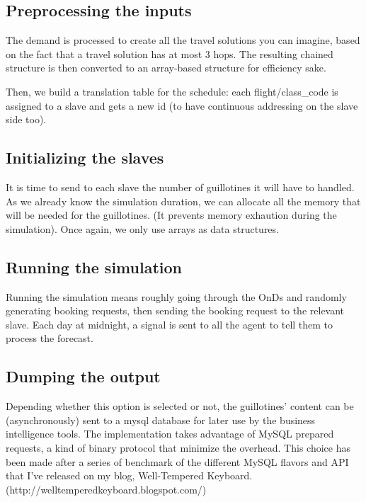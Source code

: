 \documentclass[11pt]{JHEP3}
\begin{document}
\subsection{Preprocessing the inputs}

The demand is processed to create all the travel solutions you can
imagine, based on the fact that a travel solution has at most 3
hops. The resulting chained structure is then converted to an
array-based structure for efficiency sake.

Then, we build a translation table for the schedule: each
flight/class\_code is assigned to a slave and gets a new id (to have
continuous addressing on the slave side too).

\subsection{Initializing the slaves}

It is time to send to each slave the number of guillotines it will have
to handled. As we already know the simulation duration, we can
allocate all the memory that will be needed for the guillotines. (It
prevents memory exhaution during the simulation). Once again, we only
use arrays as data structures.

\subsection{Running the simulation}

Running the simulation means roughly going through the OnDs and
randomly generating booking requests, then sending the booking request
to the relevant slave. Each day at midnight, a signal is sent to all
the agent to tell them to process the forecast.

\subsection{Dumping the output}

Depending whether this option is selected or not, the guillotines'
content can be (asynchronously) sent to a mysql database for later use
by the business intelligence tools. The implementation takes advantage
of MySQL prepared requests, a kind of binary protocol that minimize
the overhead. This choice has been made after a series of benchmark of
the different MySQL flavors and API that I've released on my blog,
Well-Tempered Keyboard. (http://welltemperedkeyboard.blogspot.com/)
\end{document}
